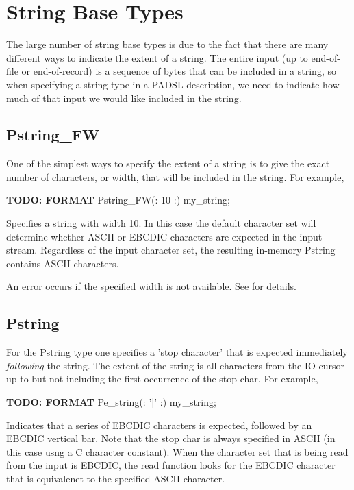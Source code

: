 \section{String Base Types}

The large number of string base types is due to the fact that there
are many different ways to indicate the extent of a string.  The
entire input (up to end-of-file or end-of-record) is a sequence of
bytes that can be included in a string, so when specifying a string
type in a PADSL description, we need to indicate how much of that
input we would like included in the string.

\subsection{Pstring\_FW}

\aedBegin{}
\aedEnd{}

One of the simplest ways to specify the extent of a string is to give the
exact number of characters, or width, that will be included in the string.
For example,
\begin{tinycodeaux}{\leftmargin=0in}
{\bf TODO: FORMAT }
Pstring\_FW(: 10 :) my\_string;
\end{tinycodeaux}
Specifies a string with width 10.  In this case the default character set
will determine whether ASCII or EBCDIC characters are expected in the
input stream.  Regardless of the input character set, the resulting in-memory 
Pstring contains ASCII characters. 

An error occurs if the specified width is not available.  See 
for details.

\subsection{Pstring}

\aedBegin{}
\aedEnd{}

For the Pstring type one specifies a 'stop character' that is
expected immediately {\em following\/} the string.  The extent of the
string is all characters from the IO cursor up
to but not including the first occurrence of the stop char.
For example,
\begin{tinycodeaux}{\leftmargin=0in}
{\bf TODO: FORMAT }
Pe\_string(: '|' :) my\_string;
\end{tinycodeaux}
Indicates that a series of EBCDIC characters is expected, followed by
an EBCDIC vertical bar.  Note that the stop char is always specified
in ASCII (in this case usng a C character constant).  When the
character set that is being read from the input is EBCDIC, the read
function looks for the EBCDIC character that is equivalenet to the
specified ASCII character.


